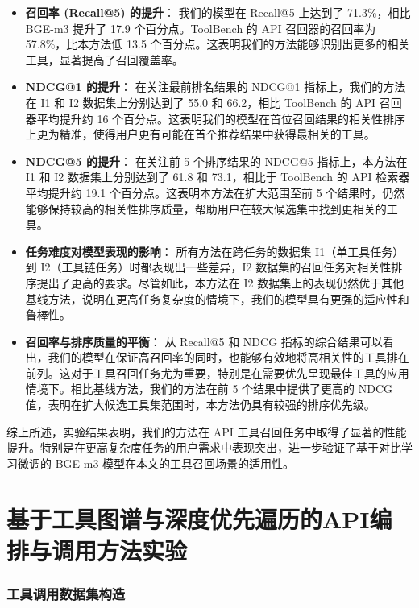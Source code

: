 \begin{itemize}
    \item \textbf{召回率 (Recall@5) 的提升}：
    我们的模型在 Recall@5 上达到了 71.3\%，相比 BGE-m3 提升了 17.9 个百分点。ToolBench 的 API 召回器的召回率为 57.8\%，比本方法低 13.5 个百分点。这表明我们的方法能够识别出更多的相关工具，显著提高了召回覆盖率。

    \item \textbf{NDCG@1 的提升}：
    在关注最前排名结果的 NDCG@1 指标上，我们的方法在 I1 和 I2 数据集上分别达到了 55.0 和 66.2，相比 ToolBench 的 API 召回器平均提升约 16 个百分点。这表明我们的模型在首位召回结果的相关性排序上更为精准，使得用户更有可能在首个推荐结果中获得最相关的工具。

    \item \textbf{NDCG@5 的提升}：
    在关注前 5 个排序结果的 NDCG@5 指标上，本方法在 I1 和 I2 数据集上分别达到了 61.8 和 73.1，相比于 ToolBench 的 API 检索器平均提升约 19.1 个百分点。这表明本方法在扩大范围至前 5 个结果时，仍然能够保持较高的相关性排序质量，帮助用户在较大候选集中找到更相关的工具。

    \item \textbf{任务难度对模型表现的影响}：
    所有方法在跨任务的数据集 I1（单工具任务）到 I2（工具链任务）时都表现出一些差异，I2 数据集的召回任务对相关性排序提出了更高的要求。尽管如此，本方法在 I2 数据集上的表现仍然优于其他基线方法，说明在更高任务复杂度的情境下，我们的模型具有更强的适应性和鲁棒性。

    \item \textbf{召回率与排序质量的平衡}：
    从 Recall@5 和 NDCG 指标的综合结果可以看出，我们的模型在保证高召回率的同时，也能够有效地将高相关性的工具排在前列。这对于工具召回任务尤为重要，特别是在需要优先呈现最佳工具的应用情境下。相比基线方法，我们的方法在前 5 个结果中提供了更高的 NDCG 值，表明在扩大候选工具集范围时，本方法仍具有较强的排序优先级。

\end{itemize}

综上所述，实验结果表明，我们的方法在 API 工具召回任务中取得了显著的性能提升。特别是在更高复杂度任务的用户需求中表现突出，进一步验证了基于对比学习微调的 BGE-m3 模型在本文的工具召回场景的适用性。

\section{基于工具图谱与深度优先遍历的API编排与调用方法实验}

\subsubsection{工具调用数据集构造}

